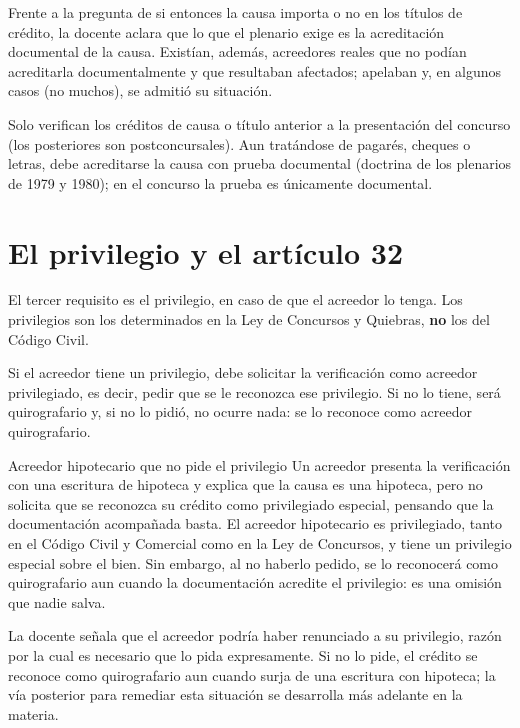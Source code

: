 \documentclass[12pt,oneside]{book}
\begin{document}
Frente a la pregunta de si entonces la causa importa o no en los títulos de crédito, la docente aclara que lo que el plenario exige es la acreditación documental de la causa. Existían, además, acreedores reales que no podían acreditarla documentalmente y que resultaban afectados; apelaban y, en algunos casos (no muchos), se admitió su situación.

\begin{important}
Solo verifican los créditos de causa o título anterior a la presentación del concurso (los posteriores son postconcursales). Aun tratándose de pagarés, cheques o letras, debe acreditarse la causa con prueba documental (doctrina de los plenarios de 1979 y 1980); en el concurso la prueba es únicamente documental.
\end{important}

\section{El privilegio y el artículo 32}
\label{sec:art32}

El tercer requisito es el privilegio, en caso de que el acreedor lo tenga. Los privilegios son los determinados en la Ley de Concursos y Quiebras, \textbf{no} los del Código Civil.

Si el acreedor tiene un privilegio, debe solicitar la verificación como acreedor privilegiado, es decir, pedir que se le reconozca ese privilegio. Si no lo tiene, será quirografario y, si no lo pidió, no ocurre nada: se lo reconoce como acreedor quirografario.

\begin{example}{Acreedor hipotecario que no pide el privilegio}
Un acreedor presenta la verificación con una escritura de hipoteca y explica que la causa es una hipoteca, pero no solicita que se reconozca su crédito como privilegiado especial, pensando que la documentación acompañada basta. El acreedor hipotecario es privilegiado, tanto en el Código Civil y Comercial como en la Ley de Concursos, y tiene un privilegio especial sobre el bien. Sin embargo, al no haberlo pedido, se lo reconocerá como quirografario aun cuando la documentación acredite el privilegio: es una omisión que nadie salva.
\end{example}

La docente señala que el acreedor podría haber renunciado a su privilegio, razón por la cual es necesario que lo pida expresamente. Si no lo pide, el crédito se reconoce como quirografario aun cuando surja de una escritura con hipoteca; la vía posterior para remediar esta situación se desarrolla más adelante en la materia.
\end{document}
